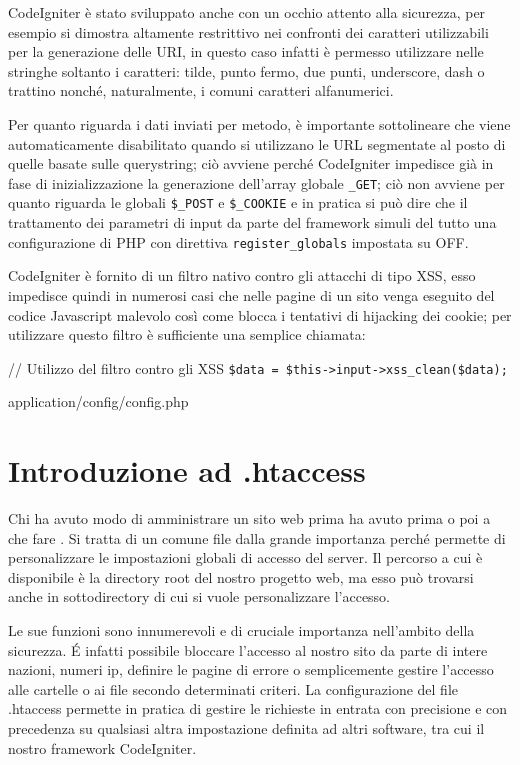 CodeIgniter è stato sviluppato anche con un occhio attento alla sicurezza, per esempio si dimostra altamente restrittivo nei confronti dei caratteri utilizzabili per la generazione delle \ac{URI}, in questo caso infatti è permesso utilizzare nelle stringhe soltanto i caratteri: tilde, punto fermo, due punti, underscore, dash o trattino nonché, naturalmente, i comuni caratteri alfanumerici.

Per quanto riguarda i dati inviati per metodo, è importante sottolineare che  viene automaticamente disabilitato quando si utilizzano le \ac{URL} segmentate al posto di quelle basate sulle querystring; ciò avviene perché CodeIgniter impedisce già in fase di inizializzazione la generazione dell'array globale \verb|_GET|; ciò non avviene per quanto riguarda le globali \verb|$_POST| e \verb|$_COOKIE| e in pratica si può dire che il trattamento dei parametri di input da parte del framework simuli del tutto una configurazione di \ac{PHP} con direttiva \verb|register_globals| impostata su OFF.

CodeIgniter è fornito di un filtro nativo contro gli attacchi di tipo \ac{XSS}, esso impedisce quindi in numerosi casi che nelle pagine di un sito venga eseguito del codice Javascript malevolo così come blocca i tentativi di hijacking dei cookie; per utilizzare questo filtro è sufficiente una semplice chiamata:

\begin{code}
// Utilizzo del filtro contro gli XSS
\verb|$data = $this->input->xss_clean($data);|
\end{code}

\begin{code}
application/config/config.php
\end{code}

\section{Introduzione ad .htaccess}
Chi ha avuto modo di amministrare un sito web prima ha avuto prima o poi a che fare . Si tratta di un comune file dalla grande importanza perché permette di personalizzare le impostazioni globali di accesso del server. Il percorso a cui è disponibile è la directory root del nostro progetto web, ma esso può trovarsi anche in sottodirectory di cui si vuole personalizzare l'accesso.

Le sue funzioni sono innumerevoli e di cruciale importanza nell'ambito della sicurezza. \'E infatti possibile bloccare l'accesso al nostro sito da parte di intere nazioni, numeri ip, definire le pagine di errore o semplicemente gestire l'accesso alle cartelle o ai file secondo determinati criteri. La configurazione del file .htaccess permette in pratica di gestire le richieste in entrata con precisione e con precedenza su qualsiasi altra impostazione definita ad altri software, tra cui il nostro framework CodeIgniter.

